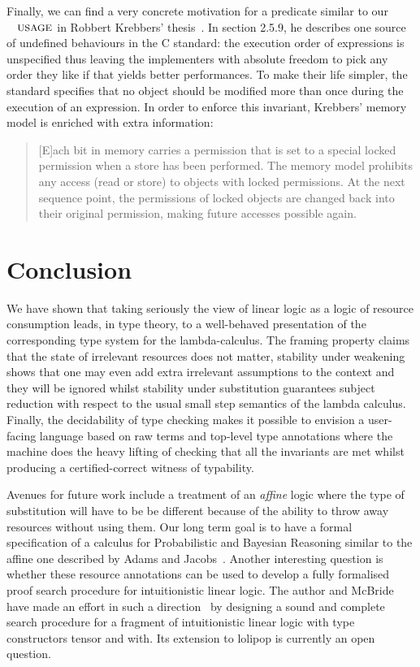Finally, we can find a very concrete motivation for a predicate similar
to our $\Usage{}$ in Robbert Krebbers' thesis~\cite{krebbers2015thesis}.
In section 2.5.9, he describes one source of undefined behaviours
in the C standard: the execution order of expressions is unspecified
thus leaving the implementers with absolute freedom to pick any order
they like if that yields better performances. To make their life
simpler, the standard specifies that no object should be modified
more than once during the execution of an expression. In order to
enforce this invariant, Krebbers' memory model is enriched with extra
information:
\begin{quote}
  [E]ach bit in memory carries a permission that is set to a special
  locked permission when a store has been performed. The memory
  model prohibits any access (read or store) to objects with locked
  permissions. At the next sequence point, the permissions of locked
  objects are changed back into their original permission, making
  future accesses possible again.
\end{quote}

\section{Conclusion}

We have shown that taking seriously the view of linear logic as a
logic of resource consumption leads, in type theory, to a well-behaved
presentation of the corresponding type system for the lambda-calculus.
The framing property claims that the state of irrelevant resources does
not matter, stability under weakening shows that one may even add extra
irrelevant assumptions to the context and they will be ignored whilst
stability under substitution guarantees subject reduction with respect
to the usual small step semantics of the lambda calculus. Finally, the
decidability of type checking makes it possible to envision a user-facing
language based on raw terms and top-level type annotations where the
machine does the heavy lifting of checking that all the invariants are
met whilst producing a certified-correct witness of typability.

Avenues for future work include a treatment of an \emph{affine} logic
where the type of substitution will have to be be different because
of the ability to throw away resources without using them. Our long
term goal is to have a formal specification of a calculus for Probabilistic
and Bayesian Reasoning similar to the affine one described by Adams
and Jacobs~\cite{Adams2015Type}.
Another interesting question is whether these resource annotations
can be used to develop a fully formalised proof search procedure for
intuitionistic linear logic. The author and McBride have made an effort
in such a direction~\cite{Allais2015Proof} by designing a sound and
complete search procedure for a fragment of intuitionistic linear logic
with type constructors tensor and with. Its extension to lolipop is
currently an open question.

